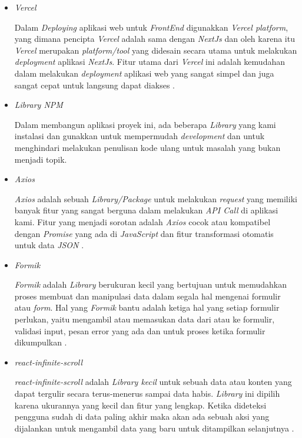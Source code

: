\documentclass[a4paper]{article}
\begin{document}
\begin{enumerate}[label=\alph*. ]
\begin{enumerate}
\begin{itemize}
                        \item \textit{Vercel}

                        Dalam \textit{Deploying} aplikasi web untuk \textit{FrontEnd} digunakkan \textit{Vercel platform}, yang dimana pencipta \textit{Vercel} adalah sama dengan \textit{NextJs} dan oleh karena itu \textit{Vercel} merupakan \textit{platform/tool} yang didesain secara utama untuk melakukan \textit{deployment} aplikasi \textit{NextJs}. Fitur utama dari \textit{Vercel} ini adalah kemudahan dalam melakukan \textit{deployment} aplikasi web yang sangat simpel dan juga sangat cepat untuk langsung dapat diakses \autocite{Nextjs_vercel}.

                        \item \textit{Library NPM}

                        Dalam membangun aplikasi proyek ini, ada beberapa \textit{Library} yang kami instalasi dan gunakkan untuk mempermudah \textit{development} dan untuk menghindari melakukan penulisan kode ulang untuk masalah yang bukan menjadi topik.

                        \item \textit{Axios}

                        \textit{Axios} adalah sebuah \textit{Library/Package} untuk melakukan \textit{request} yang memiliki banyak fitur yang sangat berguna dalam melakukan \textit{API Call} di aplikasi kami. Fitur yang menjadi sorotan adalah \textit{Axios} cocok atau kompatibel dengan \textit{Promise} yang ada di \textit{JavaScript} dan fitur transformasi otomatis untuk data \textit{JSON} \autocite{axios_github_general}.

                        \item \textit{Formik}

                        \textit{Formik} adalah \textit{Library} berukuran kecil yang bertujuan untuk memudahkan proses membuat dan manipulasi data dalam segala hal mengenai formulir atau \textit{form}. Hal yang \textit{Formik} bantu adalah ketiga hal yang setiap formulir perlukan, yaitu mengambil atau memasukan data dari atau ke formulir, validasi input, pesan error yang ada dan untuk proses ketika formulir dikumpulkan \autocite{formik_overview}.

                        \item \textit{react-infinite-scroll}

                        \textit{react-infinite-scroll} adalah \textit{Library kecil} untuk sebuah data atau konten yang dapat tergulir secara terus-menerus sampai data habis. \textit{Library} ini dipilih karena ukurannya yang kecil dan fitur yang lengkap. Ketika dideteksi pengguna sudah di data paling akhir maka akan ada sebuah aksi yang dijalankan untuk mengambil data yang baru untuk ditampilkan selanjutnya \autocite{infinite_scroll_overview}.


\end{itemize}
\end{enumerate}
\end{enumerate}
\end{document}
